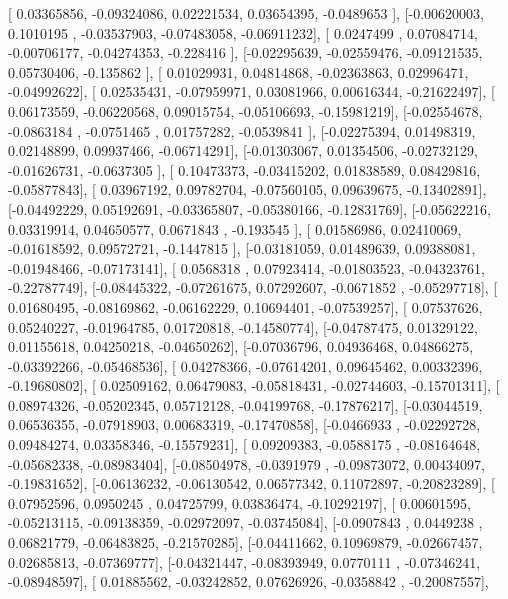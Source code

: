 \documentclass{article}
\begin{document}
       [ 0.03365856, -0.09324086,  0.02221534,  0.03654395, -0.0489653 ],
       [-0.00620003,  0.1010195 , -0.03537903, -0.07483058, -0.06911232],
       [ 0.0247499 ,  0.07084714, -0.00706177, -0.04274353, -0.228416  ],
       [-0.02295639, -0.02559476, -0.09121535,  0.05730406, -0.135862  ],
       [ 0.01029931,  0.04814868, -0.02363863,  0.02996471, -0.04992622],
       [ 0.02535431, -0.07959971,  0.03081966,  0.00616344, -0.21622497],
       [ 0.06173559, -0.06220568,  0.09015754, -0.05106693, -0.15981219],
       [-0.02554678, -0.0863184 , -0.0751465 ,  0.01757282, -0.0539841 ],
       [-0.02275394,  0.01498319,  0.02148899,  0.09937466, -0.06714291],
       [-0.01303067,  0.01354506, -0.02732129, -0.01626731, -0.0637305 ],
       [ 0.10473373, -0.03415202,  0.01838589,  0.08429816, -0.05877843],
       [ 0.03967192,  0.09782704, -0.07560105,  0.09639675, -0.13402891],
       [-0.04492229,  0.05192691, -0.03365807, -0.05380166, -0.12831769],
       [-0.05622216,  0.03319914,  0.04650577,  0.0671843 , -0.193545  ],
       [ 0.01586986,  0.02410069, -0.01618592,  0.09572721, -0.1447815 ],
       [-0.03181059,  0.01489639,  0.09388081, -0.01948466, -0.07173141],
       [ 0.0568318 ,  0.07923414, -0.01803523, -0.04323761, -0.22787749],
       [-0.08445322, -0.07261675,  0.07292607, -0.0671852 , -0.05297718],
       [ 0.01680495, -0.08169862, -0.06162229,  0.10694401, -0.07539257],
       [ 0.07537626,  0.05240227, -0.01964785,  0.01720818, -0.14580774],
       [-0.04787475,  0.01329122,  0.01155618,  0.04250218, -0.04650262],
       [-0.07036796,  0.04936468,  0.04866275, -0.03392266, -0.05468536],
       [ 0.04278366, -0.07614201,  0.09645462,  0.00332396, -0.19680802],
       [ 0.02509162,  0.06479083, -0.05818431, -0.02744603, -0.15701311],
       [ 0.08974326, -0.05202345,  0.05712128, -0.04199768, -0.17876217],
       [-0.03044519,  0.06536355, -0.07918903,  0.00683319, -0.17470858],
       [-0.0466933 , -0.02292728,  0.09484274,  0.03358346, -0.15579231],
       [ 0.09209383, -0.0588175 , -0.08164648, -0.05682338, -0.08983404],
       [-0.08504978, -0.0391979 , -0.09873072,  0.00434097, -0.19831652],
       [-0.06136232, -0.06130542,  0.06577342,  0.11072897, -0.20823289],
       [ 0.07952596,  0.0950245 ,  0.04725799,  0.03836474, -0.10292197],
       [ 0.00601595, -0.05213115, -0.09138359, -0.02972097, -0.03745084],
       [-0.0907843 ,  0.0449238 ,  0.06821779, -0.06483825, -0.21570285],
       [-0.04411662,  0.10969879, -0.02667457,  0.02685813, -0.07369777],
       [-0.04321447, -0.08393949,  0.0770111 , -0.07346241, -0.08948597],
       [ 0.01885562, -0.03242852,  0.07626926, -0.0358842 , -0.20087557],
\end{document}
